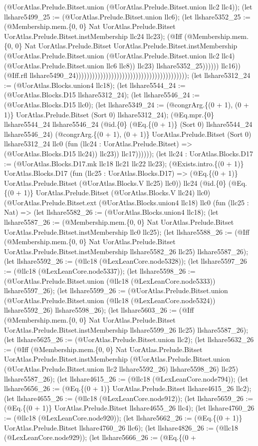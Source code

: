 \documentclass[11pt]{article}
\begin{document}
(@UorAtlas.Prelude.Bitset.union (@UorAtlas.Prelude.Bitset.union llc2 llc4)); (let llshare5499\_25 := (@UorAtlas.Prelude.Bitset.union llc6); (let llshare5352\_25 := (@Membership.mem.\{0, 0\} Nat UorAtlas.Prelude.Bitset UorAtlas.Prelude.Bitset.instMembership llc24 llc23); (@Iff (@Membership.mem.\{0, 0\} Nat UorAtlas.Prelude.Bitset UorAtlas.Prelude.Bitset.instMembership (@UorAtlas.Prelude.Bitset.union (@UorAtlas.Prelude.Bitset.union llc2 llc4) (@UorAtlas.Prelude.Bitset.union llc6 llc8)) llc23) llshare5352\_25)))))) llc16)) (@Iff.rfl llshare5490\_24))))))))))))))))))))))))))))))))))))))))); (let llshare5312\_24 := (@UorAtlas.Blocks.union4 llc18); (let llshare5544\_24 := (@UorAtlas.Blocks.D15 llshare5312\_24); (let llshare5546\_24 := (@UorAtlas.Blocks.D15 llc0); (let llshare5349\_24 := (@congrArg.\{(0 + 1), (0 + 1)\} UorAtlas.Prelude.Bitset (Sort 0) llshare5312\_24); (@Eq.mpr.\{0\} llshare5544\_24 llshare5546\_24 (@id.\{0\} (@Eq.\{(0 + 1)\} (Sort 0) llshare5544\_24 llshare5546\_24) (@congrArg.\{(0 + 1), (0 + 1)\} UorAtlas.Prelude.Bitset (Sort 0) llshare5312\_24 llc0 (fun (llc24 : UorAtlas.Prelude.Bitset) => (@UorAtlas.Blocks.D15 llc24)) llc23)) llc17)))))); (let llc24 : UorAtlas.Blocks.D17 := (@UorAtlas.Blocks.D17.mk llc18 llc21 llc22 llc23); (@Exists.intro.\{(0 + 1)\} UorAtlas.Blocks.D17 (fun (llc25 : UorAtlas.Blocks.D17) => (@Eq.\{(0 + 1)\} UorAtlas.Prelude.Bitset (@UorAtlas.Blocks.V llc25) llc0)) llc24 (@id.\{0\} (@Eq.\{(0 + 1)\} UorAtlas.Prelude.Bitset (@UorAtlas.Blocks.V llc24) llc0) (@UorAtlas.Prelude.Bitset.ext (@UorAtlas.Blocks.union4 llc18) llc0 (fun (llc25 : Nat) => (let llshare5582\_26 := (@UorAtlas.Blocks.union4 llc18); (let llshare5587\_26 := (@Membership.mem.\{0, 0\} Nat UorAtlas.Prelude.Bitset UorAtlas.Prelude.Bitset.instMembership llc0 llc25); (let llshare5588\_26 := (@Iff (@Membership.mem.\{0, 0\} Nat UorAtlas.Prelude.Bitset UorAtlas.Prelude.Bitset.instMembership llshare5582\_26 llc25) llshare5587\_26); (let llshare5592\_26 := (@llc18 (@LexLeanCore.node5328)); (let llshare5597\_26 := (@llc18 (@LexLeanCore.node5337)); (let llshare5598\_26 := (@UorAtlas.Prelude.Bitset.union (@llc18 (@LexLeanCore.node5333)) llshare5597\_26); (let llshare5599\_26 := (@UorAtlas.Prelude.Bitset.union (@UorAtlas.Prelude.Bitset.union (@llc18 (@LexLeanCore.node5324)) llshare5592\_26) llshare5598\_26); (let llshare5603\_26 := (@Iff (@Membership.mem.\{0, 0\} Nat UorAtlas.Prelude.Bitset UorAtlas.Prelude.Bitset.instMembership llshare5599\_26 llc25) llshare5587\_26); (let llshare5625\_26 := (@UorAtlas.Prelude.Bitset.union llc2); (let llshare5632\_26 := (@Iff (@Membership.mem.\{0, 0\} Nat UorAtlas.Prelude.Bitset UorAtlas.Prelude.Bitset.instMembership (@UorAtlas.Prelude.Bitset.union (@UorAtlas.Prelude.Bitset.union llc2 llshare5592\_26) llshare5598\_26) llc25) llshare5587\_26); (let llshare4615\_26 := (@llc18 (@LexLeanCore.node794)); (let llshare5656\_26 := (@Eq.\{(0 + 1)\} UorAtlas.Prelude.Bitset llshare4615\_26 llc2); (let llshare4655\_26 := (@llc18 (@LexLeanCore.node912)); (let llshare5659\_26 := (@Eq.\{(0 + 1)\} UorAtlas.Prelude.Bitset llshare4655\_26 llc4); (let llshare4760\_26 := (@llc18 (@LexLeanCore.node920)); (let llshare5662\_26 := (@Eq.\{(0 + 1)\} UorAtlas.Prelude.Bitset llshare4760\_26 llc6); (let llshare4826\_26 := (@llc18 (@LexLeanCore.node929)); (let llshare5666\_26 := (@Eq.\{(0 + 
\end{document}
